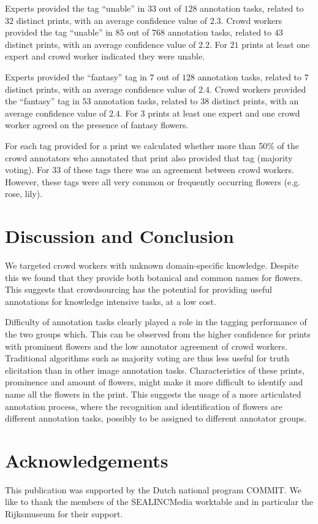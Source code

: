 \documentclass{sig-alternate-2013}
\begin{document}
Experts provided the tag ``unable'' in $33$ out of $128$ annotation tasks, related to $32$ distinct prints, with an average confidence value of $2.3$.  Crowd workers provided the tag ``unable'' in $85$ out of $768$ annotation tasks, related to $43$ distinct prints, with an average confidence value of $2.2$. For $21$ prints at least one expert and crowd worker indicated they were unable.

Experts provided the ``fantasy'' tag in $7$ out of $128$ annotation tasks, related to $7$ distinct prints, with an average confidence value of $2.4$. 
Crowd workers provided the ``fantasy'' tag in $53$ annotation tasks, related to $38$ distinct prints, with an average confidence value of $2.4$. For $3$ prints at least one expert and one crowd worker agreed on the presence of fantasy flowers.

For each tag provided for a print we calculated whether more than 50\% of the crowd annotators who annotated that print also provided that tag (majority voting). 
For 33 of these tags there was an agreement between crowd workers. However, these tags were all very common or frequently occurring flowers (e.g. rose, lily).

\section{Discussion and Conclusion}
We targeted crowd workers with unknown domain-specific knowledge. Despite this we found that they provide both botanical and common names for flowers. This suggests that crowdsourcing has the potential for providing useful annotations for knowledge intensive tasks, at a low cost.

Difficulty of annotation tasks clearly played a role in the tagging performance of the two groups which. This can be observed from the higher confidence for prints with prominent flowers and the low annotator agreement of crowd workers. Traditional algorithms such as majority voting are thus less useful for truth elicitation than in other image annotation tasks. Characteristics of these prints, prominence and amount of flowers, might make it more difficult to identify and name all the flowers in the print. This suggests the usage of a more articulated annotation process, where the recognition and identification of flowers are different annotation tasks, possibly to be assigned to different annotator groups. 

\section{Acknowledgements}
This publication was supported by the Dutch national program COMMIT. We like to thank the members of the SEALINCMedia worktable and in particular the Rijksmuseum for their support.
\end{document}
